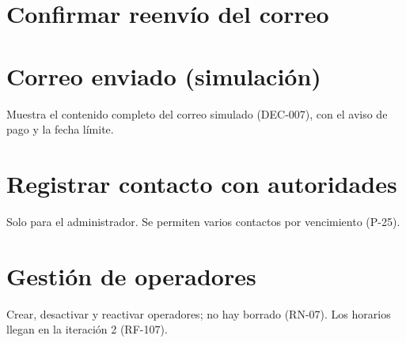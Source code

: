 \section{Confirmar reenvío del correo}

\section{Correo enviado (simulación)}
Muestra el contenido completo del correo simulado (DEC-007), con el aviso de pago y la fecha límite.

\section{Registrar contacto con autoridades}
Solo para el administrador. Se permiten varios contactos por vencimiento (P-25).

\section{Gestión de operadores}
Crear, desactivar y reactivar operadores; no hay borrado (RN-07). Los horarios llegan en la iteración 2 (RF-107).
